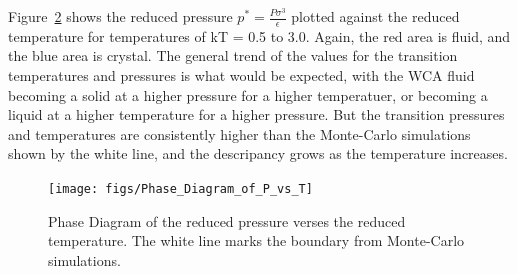 \documentclass[double,12pt]{beavtex}
\begin{document}
\begin{figure}
  \centering
  \label{fig:Phase_Diagram_of_T_vs_n_AS}
\end{figure}

Figure~\ref{fig:Phase_Diagram_P_vs_T} shows the reduced pressure $p^*=\frac{P\sigma^3}{\epsilon}$ 
plotted against the reduced temperature for temperatures of kT = 0.5 to 3.0. Again, the red area 
is fluid, and the blue area is crystal. The general trend of the values for the transition 
temperatures and pressures is what would be expected, with the WCA fluid becoming a solid at
a higher pressure for a higher temperatuer, or becoming a liquid at a higher temperature 
for a higher pressure. But the transition pressures and temperatures are consistently higher 
than the Monte-Carlo simulations shown by the white line, and the descripancy grows as 
the temperature increases. 

\begin{figure}
  \centering
  \texttt{[image: figs/Phase\_Diagram\_of\_P\_vs\_T]}
  \caption{Phase Diagram of the reduced pressure verses the reduced temperature. 
  The white line marks the boundary from Monte-Carlo simulations.}
  \label{fig:Phase_Diagram_P_vs_T}
\end{figure}

\begin{figure}
  \centering
  \label{fig:Phase_Diagram_P_vs_T_AS}
\end{figure}

\end{document}
